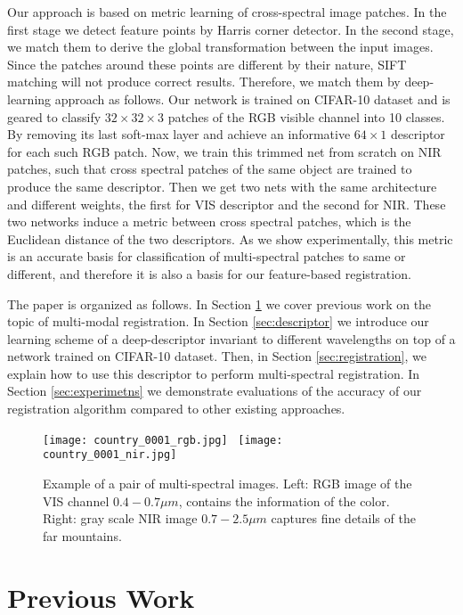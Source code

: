 \documentclass[10pt,twocolumn,letterpaper]{article}
\begin{document}
Our approach is based on metric learning of cross-spectral image patches. In the first stage we detect feature points by Harris \cite{harris} corner detector. In the second stage, we match them to derive the global transformation between the input images. Since the patches around these points are different by their nature, SIFT \cite{SIFT} matching will not produce correct results. Therefore, we match them by deep-learning approach as follows. Our network is trained on CIFAR-10 \cite{krizhevsky2009learning} dataset and is geared to classify $32\times 32\times 3$ patches of the RGB visible channel into 10 classes. By removing its last soft-max layer and achieve an informative $64\times 1$ descriptor for each such RGB patch. Now, we train this trimmed net from scratch on NIR patches, such that cross spectral patches of the same object are trained to produce the same descriptor. Then we get two nets with the same architecture and different weights, the first for VIS descriptor and the second for NIR. These two networks induce a metric between cross spectral patches, which is the Euclidean distance of the two descriptors. As we show experimentally, this metric is an accurate basis for classification of multi-spectral patches to same or different, and therefore it is also a basis for our feature-based registration.

The paper is organized as follows. In Section \ref{sec:previous} we cover previous work on the topic of multi-modal registration. In Section \ref{sec:descriptor} we introduce our learning scheme of a deep-descriptor invariant to different wavelengths on top of a network trained on CIFAR-10 dataset. Then, in Section \ref{sec:registration}, we explain how to use this descriptor to perform multi-spectral registration. In Section \ref{sec:experimetns} we demonstrate evaluations of the accuracy of our registration algorithm compared to other existing approaches.

\begin{figure}
	\centering
	\texttt{[image: country\_0001\_rgb.jpg]}~
	\texttt{[image: country\_0001\_nir.jpg]}
	
	\caption{Example of a pair of multi-spectral images. Left: RGB image of the VIS channel $0.4-0.7\mu m$, contains the information of the color. Right: gray scale NIR image $0.7-2.5\mu m$ captures fine details of the far mountains.}
	\label{fig:1}       %
\end{figure}

\section{Previous Work} \label{sec:previous}
\end{document}
